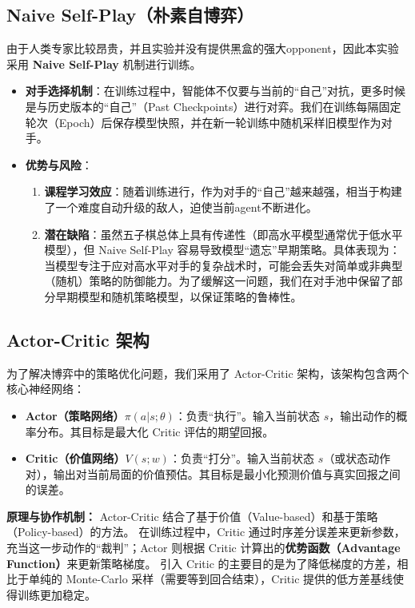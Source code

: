 \documentclass{article}
\begin{document}
\subsection{Naive Self-Play（朴素自博弈）}
由于人类专家比较昂贵，并且实验并没有提供黑盒的强大opponent，因此本实验采用 \textbf{Naive Self-Play} 机制进行训练。
\begin{itemize}
    \item \textbf{对手选择机制}：在训练过程中，智能体不仅要与当前的“自己”对抗，更多时候是与历史版本的“自己”（Past Checkpoints）进行对弈。我们在训练每隔固定轮次（Epoch）后保存模型快照，并在新一轮训练中随机采样旧模型作为对手。
    \item \textbf{优势与风险}：
    \begin{enumerate}
        \item \textbf{课程学习效应}：随着训练进行，作为对手的“自己”越来越强，相当于构建了一个难度自动升级的敌人，迫使当前agent不断进化。
        \item \textbf{潜在缺陷}：虽然五子棋总体上具有传递性（即高水平模型通常优于低水平模型），但 Naive Self-Play 容易导致模型“遗忘”早期策略。具体表现为：当模型专注于应对高水平对手的复杂战术时，可能会丢失对简单或非典型（随机）策略的防御能力。为了缓解这一问题，我们在对手池中保留了部分早期模型和随机策略模型，以保证策略的鲁棒性。
    \end{enumerate}
\end{itemize}

\subsection{Actor-Critic 架构}
为了解决博弈中的策略优化问题，我们采用了 Actor-Critic 架构，该架构包含两个核心神经网络：
\begin{itemize}
    \item \textbf{Actor（策略网络）$\pi(a|s;\theta)$}：负责“执行”。输入当前状态 $s$，输出动作的概率分布。其目标是最大化 Critic 评估的期望回报。
    \item \textbf{Critic（价值网络）$V(s;w)$}：负责“打分”。输入当前状态 $s$（或状态动作对），输出对当前局面的价值预估。其目标是最小化预测价值与真实回报之间的误差。
\end{itemize}

\textbf{原理与协作机制：}
Actor-Critic 结合了基于价值（Value-based）和基于策略（Policy-based）的方法。
在训练过程中，Critic 通过时序差分误差来更新参数，充当这一步动作的“裁判”；Actor 则根据 Critic 计算出的\textbf{优势函数（Advantage Function）}来更新策略梯度。
引入 Critic 的主要目的是为了降低梯度的方差，相比于单纯的 Monte-Carlo 采样（需要等到回合结束），Critic 提供的低方差基线使得训练更加稳定。
\end{document}
